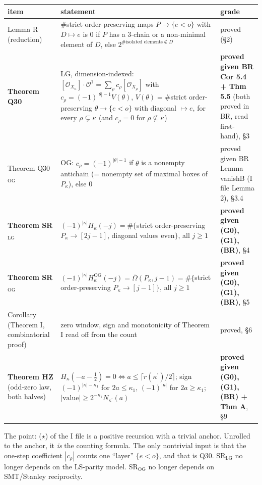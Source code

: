 \documentclass[10pt]{amsart}
\newcommand{\LG}{\mathrm{LG}}
\newcommand{\OG}{\mathrm{OG}}
\newcommand{\Ob}{\bar\Omega}
\newcommand{\eo}{\{e<o\}}
\newcommand{\pr}{^{\prime}}
\theoremstyle{remark}
\begin{document}
\begin{longtable}{@{}>{\raggedright\arraybackslash}p{}>{\raggedright\arraybackslash}p{}>{\raggedright\arraybackslash}p{}@{}}
\toprule
item & statement & grade\\\midrule
Lemma R (reduction) & \#strict order-preserving maps $P\to\eo$ with $D\mapsto e$ is $0$ if $P$ has a 3-chain or a
non-minimal element of $D$, else $2^{\#\text{isolated elements}\notin D}$ & proved (\S2)\\
\textbf{Theorem Q30} & LG, dimension-indexed: $[\mathcal O_{X_\kappa}]\cdot\mathcal O^1=\sum_\rho c_\rho[\mathcal O_{X_\rho}]$
with $c_\rho=(-1)^{|\theta|-1}V(\theta)$, $V(\theta)=\#$strict order-preserving $\theta\to\eo$ with diagonal $\mapsto e$,
for every $\rho\subsetneq\kappa$ (and $c_\rho=0$ for $\rho\not\subseteq\kappa$) & \textbf{proved given BR Cor 5.4 + Thm 5.5}
(both proved in BR, read first-hand), \S3\\
Theorem Q30$_{\OG}$ & OG: $c_\rho=(-1)^{|\theta|-1}$ if $\theta$ is a nonempty antichain (= nonempty set of maximal
boxes of $P_\kappa$), else $0$ & proved given BR Lemma vanishB (I file Lemma 2), \S3.4\\
\textbf{Theorem SR$_{\LG}$} & $(-1)^{|\kappa|}H_\kappa(-j)=\#\{$strict order-preserving $P_\kappa\to[2j-1]$, diagonal values
even$\}$, all $j\ge1$ & \textbf{proved given (G0), (G1), (BR)}, \S4\\
\textbf{Theorem SR$_{\OG}$} & $(-1)^{|\kappa|}H^{\OG}_\kappa(-j)=\Ob(P_\kappa,j-1)=\#\{$strict order-preserving
$P_\kappa\to[j-1]\}$, all $j\ge1$ & \textbf{proved given (G0), (G1), (BR)}, \S5\\
Corollary (Theorem I, combinatorial proof) & zero window, sign and monotonicity of Theorem I read off from the count &
proved, \S6\\
\textbf{Theorem HZ} (odd-zero law, both halves) & $H_\kappa(-a-\tfrac12)=0\iff a\le\lceil r(\kappa\pr)/2\rceil$; sign
$(-1)^{|\kappa|-\kappa_1}$ for $2a\le\kappa_1$, $(-1)^{|\kappa|}$ for $2a\ge\kappa_1$; $|\text{value}|\ge
2^{-\kappa_1}N_{\kappa\pr}(a)$ & \textbf{proved given (G0), (G1), (BR) + Thm A}, \S9\\
\bottomrule
\end{longtable}

The point: ($\star$) of the I file is a positive recursion with a trivial anchor. Unrolled to the anchor, it \emph{is} the
counting formula. The only nontrivial input is that the one-step coefficient $|c_\rho|$ counts one ``layer'' $\eo$, and
that is Q30. SR$_{\LG}$ no longer depends on the LS-parity model. SR$_{\OG}$ no longer depends on SMT/Stanley reciprocity.
\end{document}
